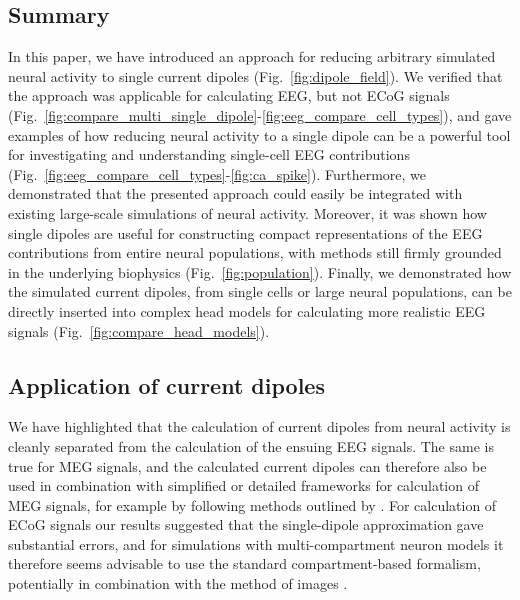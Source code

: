 \documentclass[preprint,10pt,authoryear]{elsarticle}
\newcommand{\hlp}[2][Purple]{ {\sethlcolor{#1} \hl{#2}} }
\newcommand{\gen}[1]{\color{white}{\hlp{GTE: #1 }}\color{black}}
\begin{document}

\subsection{Summary}
In this paper, we have introduced an approach for reducing arbitrary simulated neural activity to single current dipoles (Fig.~\ref{fig:dipole_field}). 
We verified that the approach was applicable for calculating EEG, but not ECoG signals (Fig.~\ref{fig:compare_multi_single_dipole}-\ref{fig:eeg_compare_cell_types}), and gave examples of how reducing neural activity to a single dipole can be a powerful tool for investigating and understanding single-cell EEG contributions (Fig.~\ref{fig:eeg_compare_cell_types}-\ref{fig:ca_spike}). Furthermore, we demonstrated that the presented approach could easily be integrated with existing large-scale simulations of neural activity. Moreover, it was shown how single dipoles are useful for constructing compact representations of the EEG contributions from entire neural populations, with methods still firmly grounded in the underlying biophysics (Fig.~\ref{fig:population}). Finally, we demonstrated how the simulated current dipoles, from single cells or large neural populations, can be directly inserted into complex head models for calculating more realistic EEG signals (Fig.~\ref{fig:compare_head_models}).

\subsection{Application of current dipoles}
We have highlighted that the calculation of current dipoles from neural activity is cleanly separated from the calculation of the ensuing EEG signals. The same is true for MEG signals, and the calculated current dipoles can therefore also be used in combination with simplified or detailed frameworks for calculation of MEG signals, for example by following methods outlined by \cite{Ilmoniemi2019}.
For calculation of ECoG signals our results suggested that the single-dipole approximation gave substantial errors, and for simulations with multi-compartment neuron models it therefore seems advisable to use the standard compartment-based formalism, potentially in combination with the method of images \citep{Pettersen2006, HAGEN2018}.
\end{document}
